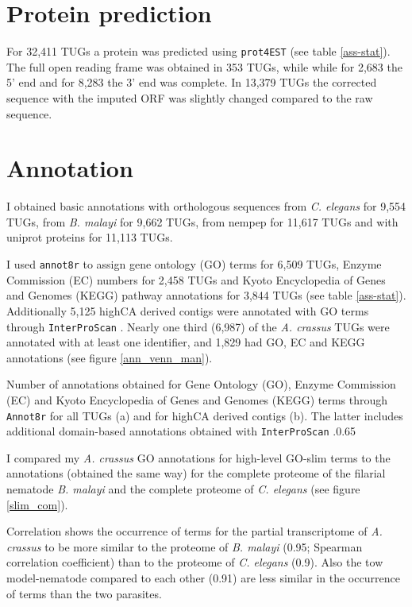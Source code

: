 \section{Protein prediction}

For 32,411 TUGs a protein was predicted using \texttt{prot4EST}
\cite{wasmuth_prot4est:_2004} (see table \ref{ass-stat}). The full
open reading frame was obtained in 353 TUGs, while while for 2,683 the
5' end and for 8,283 the 3' end was complete. In 13,379 TUGs the
corrected sequence with the imputed ORF was slightly changed compared
to the raw sequence.

\section{Annotation}
\label{454-annot}

I obtained basic annotations with orthologous sequences from
\textit{C. elegans} for 9,554 TUGs, from \textit{B. malayi} for 9,662
TUGs, from nempep \cite{parkinson_nembase:resource_2004, pmid21550347}
for 11,617 TUGs and with uniprot proteins for 11,113 TUGs.

I used \texttt{annot8r} \cite{schmid_annot8r:_2008} to assign gene
ontology (GO) terms for 6,509 TUGs, Enzyme Commission (EC) numbers for
2,458 TUGs and Kyoto Encyclopedia of Genes and Genomes (KEGG) pathway
annotations for 3,844 TUGs (see table \ref{ass-stat}). Additionally
5,125 highCA derived contigs were annotated with GO terms through
\texttt{InterProScan} \cite{pmid11590104}. Nearly one third (6,987) of
the \textit{A. crassus} TUGs were annotated with at least one
identifier, and 1,829 had GO, EC and KEGG annotations (see figure
\ref{ann_venn_man}).

 {Number
  of annotations obtained for Gene Ontology (GO), Enzyme Commission
  (EC) and Kyoto Encyclopedia of Genes and Genomes (KEGG) terms
  through \texttt{Annot8r} \cite{schmid_annot8r:_2008} for all TUGs
  (a) and for highCA derived contigs (b). The latter includes
  additional domain-based annotations obtained with
  \texttt{InterProScan} \cite{pmid11590104}.}{0.65}

I compared my \textit{A. crassus} GO annotations for high-level
GO-slim terms to the annotations (obtained the same way) for the
complete proteome of the filarial nematode \textit{B. malayi} and the
complete proteome of \textit{C. elegans} (see figure \ref{slim_com}).

Correlation shows the occurrence of terms for the partial
transcriptome of \textit{A. crassus} to be more similar to the
proteome of \textit{B. malayi} (0.95; Spearman correlation
coefficient) than to the proteome of \textit{C. elegans} (0.9). Also
the tow model-nematode compared to each other (0.91) are less similar
in the occurrence of terms than the two parasites.

